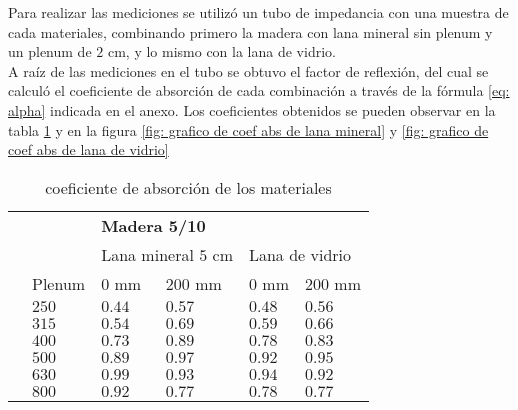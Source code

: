 Para realizar las mediciones se utilizó un tubo de impedancia con una muestra de cada materiales, combinando primero la madera con lana mineral sin plenum y un plenum de $2$ cm, y lo mismo con la lana de vidrio.\\
A raíz de las mediciones en el tubo se obtuvo el factor de reflexión, del cual se calculó el coeficiente de absorción de cada combinación a través de la fórmula \ref{eq: alpha} indicada en el anexo. Los coeficientes obtenidos se pueden observar en la tabla \ref{tab: coef de abs medidos} y en la figura \ref{fig: grafico de coef abs de lana mineral} y \ref{fig: grafico de coef abs de lana de vidrio}
\begin{table}[H]
    \centering
    \caption{coeficiente de absorción de los materiales}
    \label{tab: coef de abs medidos}
    \begin{tabular}{ll|llll|}
    \cline{3-6}
     &  & \multicolumn{4}{l|}{\textbf{Madera 5/10}} \\ \cline{3-6} 
     &  & \multicolumn{2}{l|}{Lana mineral $5$ cm} & \multicolumn{2}{l|}{Lana de vidrio} \\ \cline{2-6} 
    \multicolumn{1}{l|}{} & Plenum & \multicolumn{1}{l|}{\cellcolor[HTML]{8784C7}$0$ mm} & \multicolumn{1}{l|}{\cellcolor[HTML]{AD84C6}$200$ mm} & \multicolumn{1}{l|}{\cellcolor[HTML]{5D739A}$0$ mm} & \cellcolor[HTML]{6997AF}$200$ mm \\ \hline
    \multicolumn{1}{|l|}{} & $250$ & \multicolumn{1}{l|}{$0.44$} & \multicolumn{1}{l|}{$0.57$} & \multicolumn{1}{l|}{$0.48$} & $0.56$ \\ \cline{2-6} 
    \multicolumn{1}{|l|}{} & $315$ & \multicolumn{1}{l|}{$0.54$} & \multicolumn{1}{l|}{$0.69$} & \multicolumn{1}{l|}{$0.59$} & $0.66$ \\ \cline{2-6} 
    \multicolumn{1}{|l|}{} & $400$ & \multicolumn{1}{l|}{$0.73$} & \multicolumn{1}{l|}{$0.89$} & \multicolumn{1}{l|}{$0.78$} & $0.83$ \\ \cline{2-6} 
    \multicolumn{1}{|l|}{} & $500$ & \multicolumn{1}{l|}{$0.89$} & \multicolumn{1}{l|}{$0.97$} & \multicolumn{1}{l|}{$0.92$} & $0.95$ \\ \cline{2-6} 
    \multicolumn{1}{|l|}{} & $630$ & \multicolumn{1}{l|}{$0.99$} & \multicolumn{1}{l|}{$0.93$} & \multicolumn{1}{l|}{$0.94$} & $0.92$ \\ \cline{2-6} 
    \multicolumn{1}{|l|}{} & $800$ & \multicolumn{1}{l|}{$0.92$} & \multicolumn{1}{l|}{$0.77$} & \multicolumn{1}{l|}{$0.78$} & $0.77$ \\ \cline{2-6} 

\end{tabular}
\end{table}
